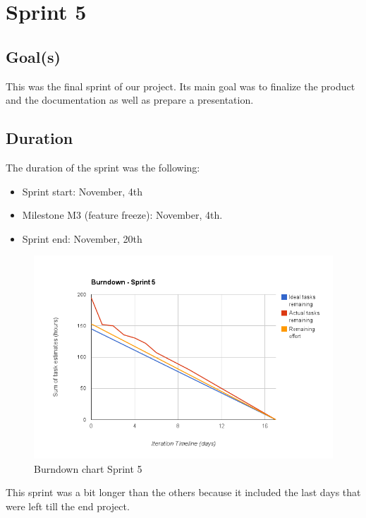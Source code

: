 

\chapter{Sprint 5}
\label{Sprint0}

\section{Goal(s)}

This was the final sprint of our project. Its main goal was to
finalize the product and the documentation as well as prepare
a presentation.

\section{Duration}
The duration of the sprint was the following:
\begin{itemize}
\item Sprint start:  November, 4th
\item Milestone M3 (feature freeze): November, 4th.
\item Sprint end: November, 20th
\end{itemize}

\begin{figure}[h]
\centering
\includegraphics[scale=0.60]{../Figures/burndownSprint5.png}
\caption{Burndown chart Sprint 5}
\label{figure:burndownsprint5}
\end{figure}

This sprint was a bit longer than the others because it included the last days
that were left till the end project.

